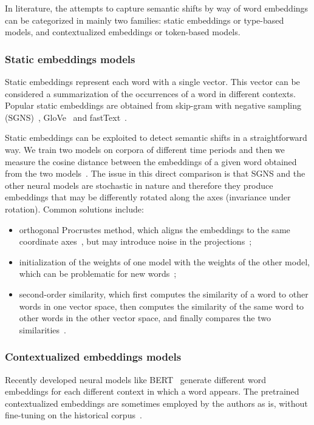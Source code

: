 \documentclass[runningheads]{llncs}
\begin{document}
In literature, the attempts to capture semantic shifts by way of word embeddings can be categorized in mainly two families: static embeddings or type-based models, and contextualized embeddings or token-based models.

\subsubsection{Static embeddings models} Static embeddings represent each word with a single vector. This vector can be considered a summarization of the occurrences of a word in different contexts. Popular static embeddings are obtained from skip-gram with negative sampling (SGNS)~\cite{mikolov-etal-2013-word2vec}, GloVe~\cite{pennington-etal-2014-glove} and fastText~\cite{bojanowski-etal-2017-fasttext}.

Static embeddings can be exploited to detect semantic shifts in a straightforward way. We train two models on corpora of different time periods and then we measure the cosine distance between the embeddings of a given word obtained from the two models~\cite{hamilton-etal-2016-diachronic}. The issue in this direct comparison is that SGNS and the other neural models are stochastic in nature and therefore they produce embeddings that may be differently rotated along the axes (invariance under rotation). Common solutions include:

\begin{itemize}
    \item orthogonal Procrustes method, which aligns the embeddings to the same coordinate axes~\cite{hamilton-etal-2016-diachronic}, but may introduce noise in the projections~\cite{dubossarsky-etal-2019-time};
    \item initialization of the weights of one model with the weights of the other model, which can be problematic for new words~\cite{kutuzov-etal-2018-diachronic,tahmasebi-etal-2018-survey};
    \item second-order similarity, which first computes the similarity of a word to other words in one vector space, then computes the similarity of the same word to other words in the other vector space, and finally compares the two similarities~\cite{kutuzov-etal-2018-diachronic,tahmasebi-etal-2018-survey}.   
\end{itemize}

\subsubsection{Contextualized embeddings models} Recently developed neural models like BERT~\cite{devlin-etal-2018-bert} generate different word embeddings for each different context in which a word appears. The pretrained contextualized embeddings are sometimes employed by the authors as is, without fine-tuning on the historical corpus~\cite{rother-etal-2020-cmce,laicher-etal-2021-explaining}. 
\end{document}
